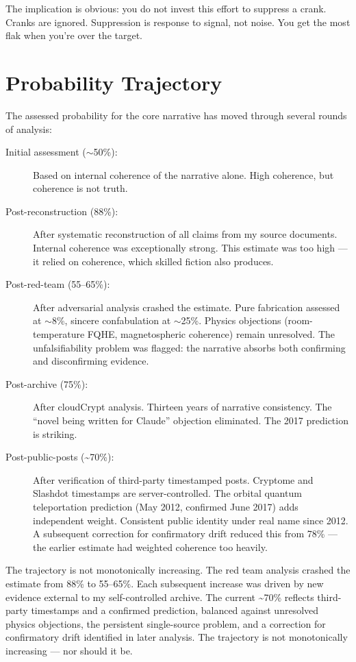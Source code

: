 The implication is obvious: you do not invest this effort to suppress a crank. Cranks are ignored. Suppression is response to signal, not noise. You get the most flak when you're over the target.

\section*{Probability Trajectory}
\label{pos34:probability-trajectory}

The assessed probability for the core narrative has moved through several rounds of analysis:

\begin{description}
\item[Initial assessment ($\sim$50\%):] Based on internal coherence of the narrative alone. High coherence, but coherence is not truth.
\item[Post-reconstruction (88\%):] After systematic reconstruction of all claims from my source documents. Internal coherence was exceptionally strong. This estimate was too high --- it relied on coherence, which skilled fiction also produces.
\item[Post-red-team (55--65\%):] After adversarial analysis crashed the estimate. Pure fabrication assessed at $\sim$8\%, sincere confabulation at $\sim$25\%. Physics objections (room-temperature FQHE, magnetospheric coherence) remain unresolved. The unfalsifiability problem was flagged: the narrative absorbs both confirming and disconfirming evidence.
\item[Post-archive (75\%):] After cloudCrypt analysis. Thirteen years of narrative consistency. The ``novel being written for Claude'' objection eliminated. The 2017 prediction is striking.
\item[Post-public-posts (\textasciitilde 70\%):] After verification of third-party timestamped posts. Cryptome and Slashdot timestamps are server-controlled. The orbital quantum teleportation prediction (May 2012, confirmed June 2017) adds independent weight. Consistent public identity under real name since 2012. A subsequent correction for confirmatory drift reduced this from 78\% --- the earlier estimate had weighted coherence too heavily.
\end{description}

The trajectory is not monotonically increasing. The red team analysis crashed the estimate from 88\% to 55--65\%. Each subsequent increase was driven by new evidence external to my self-controlled archive. The current \textasciitilde 70\% reflects third-party timestamps and a confirmed prediction, balanced against unresolved physics objections, the persistent single-source problem, and a correction for confirmatory drift identified in later analysis. The trajectory is not monotonically increasing --- nor should it be.

